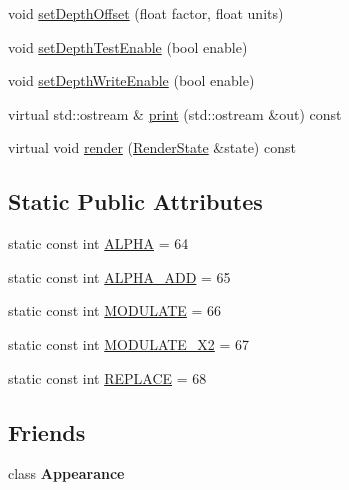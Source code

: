 \begin{CompactItemize}
\item 
void \hyperlink{classm3g_1_1CompositingMode_4c825055ad0b5910ef4f9136d9a8e588}{setDepthOffset} (float factor, float units)
\item 
void \hyperlink{classm3g_1_1CompositingMode_5f1afccdc51665bb04c971579d8ee05c}{setDepthTestEnable} (bool enable)
\item 
void \hyperlink{classm3g_1_1CompositingMode_a3275c9589ef319c6ba6f5c22d0b2860}{setDepthWriteEnable} (bool enable)
\item 
virtual std::ostream \& \hyperlink{classm3g_1_1CompositingMode_6fea17fa1532df3794f8cb39cb4f911f}{print} (std::ostream \&out) const 
\item 
virtual void \hyperlink{classm3g_1_1CompositingMode_8babc8a79b78615da51161e94029eea9}{render} (\hyperlink{structm3g_1_1RenderState}{RenderState} \&state) const 
\end{CompactItemize}
\subsection*{Static Public Attributes}
\begin{CompactItemize}
\item 
static const int \hyperlink{classm3g_1_1CompositingMode_417581fcde4067111f47320edb2aa378}{ALPHA} = 64
\item 
static const int \hyperlink{classm3g_1_1CompositingMode_91ac80a5450e5f7f7e382860829030d9}{ALPHA\_\-ADD} = 65
\item 
static const int \hyperlink{classm3g_1_1CompositingMode_96b64c2847348fb73a90c4a501cda9d1}{MODULATE} = 66
\item 
static const int \hyperlink{classm3g_1_1CompositingMode_cb426684e42a5ae425989c65fbb7dbc4}{MODULATE\_\-X2} = 67
\item 
static const int \hyperlink{classm3g_1_1CompositingMode_47a00ac5a59817a48db06fb2a538883c}{REPLACE} = 68
\end{CompactItemize}
\subsection*{Friends}
\begin{CompactItemize}
\item 
\hypertarget{classm3g_1_1CompositingMode_afa5201a494f65c37039281d9b63a2a9}{
class \textbf{Appearance}}
\label{classm3g_1_1CompositingMode_afa5201a494f65c37039281d9b63a2a9}

\end{CompactItemize}


